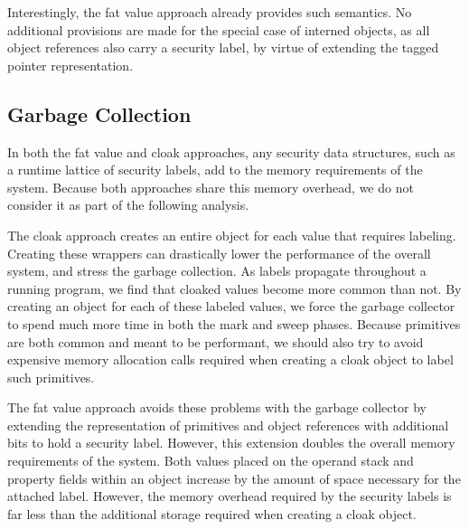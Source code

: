 \documentclass[11pt,onecolumn]{article}
\begin{document}
Interestingly, the fat value approach already provides such semantics.
No additional provisions are made for the special case of interned objects, as all object references also carry a security label, by virtue of extending the tagged pointer representation.


\subsection{Garbage Collection}\label{sec:garbage-collection}

In both the fat value and cloak approaches, any security data structures, such as a runtime lattice of security labels, add to the memory requirements of the system.
Because both approaches share this memory overhead, we do not consider it as part of the following analysis.

The cloak approach creates an entire object for each value that requires labeling.
Creating these wrappers can drastically lower the performance of the overall system, and stress the garbage collection.
As labels propagate throughout a running program, we find that cloaked values become more common than not.
By creating an object for each of these labeled values, we force the garbage collector to spend much more time in both the mark and sweep phases.
Because primitives are both common and meant to be performant, we should also try to avoid expensive memory allocation calls required when creating a cloak object to label such primitives.

The fat value approach avoids these problems with the garbage collector by extending the representation of primitives and object references with additional bits to hold a security label.
However, this extension doubles the overall memory requirements of the system.
Both values placed on the operand stack and property fields within an object increase by the amount of space necessary for the attached label.
However, the memory overhead required by the security labels is far less than the additional storage required when creating a cloak object.
\end{document}
